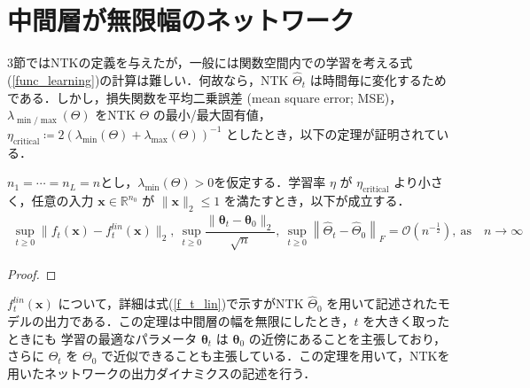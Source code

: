 \section{中間層が無限幅のネットワーク}
\label{infinite_width}
3節ではNTKの定義を与えたが，一般には関数空間内での学習を考える式(\ref{func_learning})の計算は難しい．何故なら，NTK $\hat{\Theta}_t$ は時間毎に変化するためである．しかし，損失関数を平均二乗誤差 (mean square error; MSE)，$\lambda_{\min/\max}(\Theta)$ をNTK $\Theta$ の最小/最大固有値，$\eta_{\text{critical}} \coloneqq 2(\lambda_{\min}(\Theta)+\lambda_{\max}(\Theta))^{-1}$ としたとき，以下の定理が証明されている．
\begin{thm}
\label{statement_ntk}
    $n_1 = \cdots = n_L = n$とし，$\lambda_{\min}(\Theta) > 0$を仮定する．学習率 $\eta$ が $\eta_{\text{critical}}$ より小さく，任意の入力 $\bm{x} \in \mathbb{R}^{n_0}$ が $\|\bm{x}\|_2 \leq 1$ を満たすとき，以下が成立する．
    \begin{align*}
        \sup_{t \geq 0} \|f_t(\bm{x}) - f_t^{lin}(\bm{x})\|_2, \ \sup_{t \geq 0} \dfrac{\|\bm{\theta}_t - \bm{\theta}_0\|_2}{\sqrt{n}}, \ \sup_{t \geq 0}\left\|\hat{\Theta}_t - \hat{\Theta}_0\right\|_F = \mathcal{O}\left(n^{-\frac{1}{2}}\right), \ \mbox{as} \quad n \rightarrow \infty
    \end{align*}
\end{thm}
\begin{proof}

\end{proof}
\par
\noindent
$f_t^{lin}(\bm{x})$ について，詳細は式(\ref{f_t_lin})で示すがNTK $\hat{\Theta}_0$ を用いて記述されたモデルの出力である．この定理は中間層の幅を無限にしたとき，$t$ を大きく取ったときにも 学習の最適なパラメータ $\bm{\theta}_t$ は $\bm{\theta}_0$ の近傍にあることを主張しており，さらに $\Theta_t$ を $\Theta_0$ で近似できることも主張している．この定理を用いて，NTKを用いたネットワークの出力ダイナミクスの記述を行う．